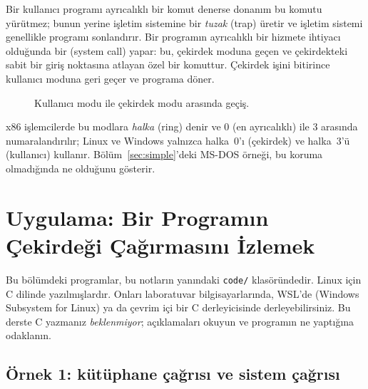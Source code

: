 Bir kullanıcı programı ayrıcalıklı bir komut denerse donanım bu komutu yürütmez; bunun yerine işletim sistemine bir \emph{tuzak} (trap) üretir ve işletim sistemi genellikle programı sonlandırır. Bir programın ayrıcalıklı bir hizmete ihtiyacı olduğunda bir  (system call) yapar: bu, çekirdek moduna geçen ve çekirdekteki sabit bir giriş noktasına atlayan özel bir komuttur. Çekirdek işini bitirince kullanıcı moduna geri geçer ve programa döner.

\begin{figure}[H]
\centering
{}
\caption{Kullanıcı modu ile çekirdek modu arasında geçiş.}
\end{figure}

x86 işlemcilerde bu modlara \emph{halka} (ring) denir ve $0$ (en ayrıcalıklı) ile $3$ arasında numaralandırılır; Linux ve Windows yalnızca halka~0'ı (çekirdek) ve halka~3'ü (kullanıcı) kullanır. Bölüm~\ref{sec:simple}'deki MS-DOS örneği, bu koruma olmadığında ne olduğunu gösterir.

\section{Uygulama: Bir Programın Çekirdeği Çağırmasını İzlemek}
\label{sec:syscall}

Bu bölümdeki programlar, bu notların yanındaki \texttt{code/} klasöründedir. Linux için C dilinde yazılmışlardır. Onları laboratuvar bilgisayarlarında, WSL'de (Windows Subsystem for Linux) ya da çevrim içi bir C derleyicisinde derleyebilirsiniz. Bu derste C yazmanız \emph{beklenmiyor}; açıklamaları okuyun ve programın ne yaptığına odaklanın.

\subsection{Örnek 1: kütüphane çağrısı ve sistem çağrısı}

